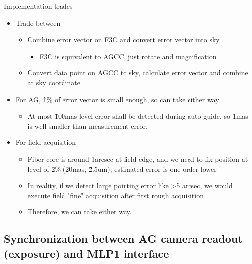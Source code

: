 \documentclass[a4paper,notitlepage]{article}
\begin{document}
Implementation trades
\begin{itemize}
  \item Trade between
  \begin{itemize}
    \item Combine error vector on F3C and convert error vector into sky
    \begin{itemize}
      \item F3C is equivalent to AGCC, just rotate and magnification
    \end{itemize}
    \item Convert data point on AGCC to sky, calculate error vector and combine at sky coordinate
  \end{itemize}
  \item For AG, \~1\% of error vector is small enough, so can take either way
  \begin{itemize}
    \item At most \~100mas level error shall be detected during auto guide, so 1mas is well smaller than measurement error.
  \end{itemize}
  \item For field acquisition
  \begin{itemize}
    \item Fiber core is around 1arcsec at field edge, and we need to fix position at level of \~2\% (\~20mas, \~2.5um); estimated error is one order lower
    \item In reality, if we detect large pointing error like >5 arcsec, we would execute field "fine" acquisition after first rough acquisition
    \item Therefore, we can take either way.
  \end{itemize}
\end{itemize}


\subsection{Synchronization between AG camera readout (exposure) and MLP1 interface}
\end{document}
